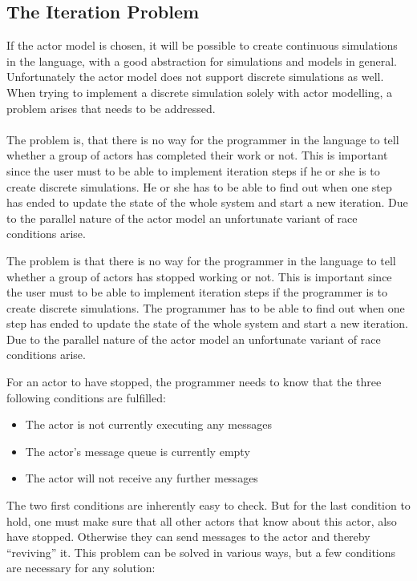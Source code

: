 \subsection{The Iteration Problem}

If the actor model is chosen, it will be possible to create continuous simulations in the language, with a good abstraction for simulations and models in general. Unfortunately the actor model does not support discrete simulations as well. When trying to implement a discrete simulation solely with actor modelling, a problem arises that needs to be addressed. \\\\ 
The problem is, that there is no way for the programmer in the language to tell whether a group of actors has completed their work or not. This is important since the user must to be able to implement iteration steps if he or she is to create discrete simulations. He or she has to be able to find out when one step has ended to update the state of the whole system and start a new iteration. Due to the parallel nature of the actor model an unfortunate variant of race conditions arise.

The problem is that there is no way for the programmer in the language to tell whether a group of actors has stopped working or not. This is important since the user must to be able to implement iteration steps if the programmer is to create discrete simulations. The programmer has to be able to find out when one step has ended to update the state of the whole system and start a new iteration. Due to the parallel nature of the actor model an unfortunate variant of race conditions arise.

For an actor to have stopped, the programmer needs to know that the three following conditions are fulfilled:
\begin{itemize}
\item The actor is not currently executing any messages
\item The actor's message queue is currently empty
\item The actor will not receive any further messages
\end{itemize} 

The two first conditions are inherently easy to check. But for the last condition to hold, one must make sure that all other actors that know about this actor, also have stopped. Otherwise they can send messages to the actor and thereby \enquote{reviving} it. This problem can be solved in various ways, but a few conditions are necessary for any solution:

